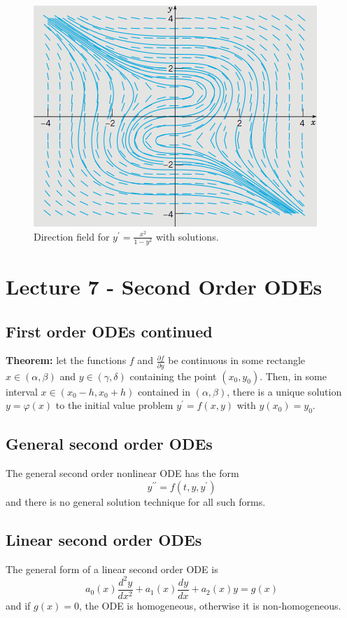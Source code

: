 \documentclass[11pt]{article}
\newcommand{\fdx}{\frac{dy}{dx}} %
\newcommand{\sdx}{\frac{d^2y}{dx^2}}
\newcommand{\yp}{y^{\prime}}
\newcommand{\ypp}{y^{\prime\prime}}
\begin{document}
	\begin{figure}[ht]
		\centering
		\includegraphics[scale=1]{L6directionfield2}
		\caption{Direction field for $\yp = \frac{x^2}{1 - y^2}$ with solutions.}
	\end{figure}

\section{Lecture 7 - Second Order ODEs}
\subsection{First order ODEs continued}
	\textbf{Theorem:} let the functions $f$ and $\frac{\partial f}{\partial y}$ be continuous in some rectangle $x \in (\alpha, \beta)$ and $y \in (\gamma, \delta)$ containing the point $(x_0, y_0)$. Then, in some interval $x \in (x_0 - h, x_0 + h)$ contained in $(\alpha, \beta)$, there is a unique solution $y = \varphi(x)$ to the initial value problem $\yp = f(x,y)$ with $y(x_0) = y_0$.

\subsection{General second order ODEs}
	The general second order nonlinear ODE has the form
		$$ \ypp = f(t, y, \yp) $$
	and there is no general solution technique for all such forms.

\subsection{Linear second order ODEs}
	The general form of a linear second order ODE is
		$$ a_0 (x) \sdx + a_1 (x) \fdx + a_2 (x) y = g(x) $$
	and if $g(x) = 0$, the ODE is homogeneous, otherwise it is non-homogeneous.
\end{document}
